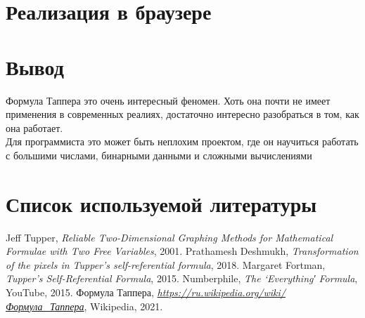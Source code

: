 \documentclass[a4paper,12pt]{article}
\begin{document}
\section{Реализация в браузере}
\section{Вывод}
Формула Таппера это очень интересный феномен. Хоть она почти не имеет применения в современных реалиях, достаточно интересно разобраться в том, как она работает.\\

Для программиста это может быть неплохим проектом, где он научиться работать с большими числами, бинарными данными и сложными вычислениями\\

\renewcommand*{\refname}{\vspace*{-2em}}
\section{Список используемой литературы}
\begin{thebibliography}{9}
	 Jeff Tupper, \emph{Reliable Two-Dimensional Graphing Methods
for Mathematical Formulae with Two Free Variables}, 2001.
	 Prathamesh Deshmukh, \emph{Transformation of the pixels in Tupper's self-referential formula}, 2018.
	 Margaret Fortman, \emph{Tupper’s Self-Referential Formula}, 2015.
	 Numberphile, \emph{The ‘Everything′ Formula}, YouTube, 2015.
	 Формула Таппера, \emph{\url{https://ru.wikipedia.org/wiki/Формула_Таппера}}, Wikipedia, 2021.
\end{thebibliography}
\end{document}
